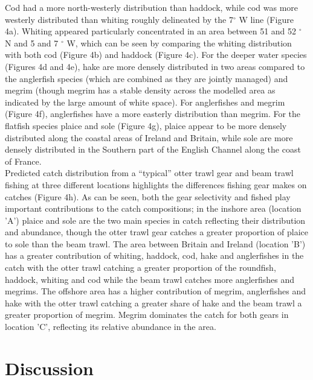 \documentclass[fleqn,10pt]{wlscirep}
\begin{document}
\begin{linenumbers}
Cod had a more north-westerly distribution than haddock, while cod was more
westerly distributed than whiting roughly delineated by the 7$^{\circ}$ W line
(Figure 4a). Whiting appeared particularly concentrated in an area between 51
and 52 $^{\circ}$ N and 5 and 7 $^{\circ}$ W, which can be seen by comparing
the whiting distribution with both cod (Figure 4b) and haddock (Figure 4c). For
the deeper water species (Figures 4d and 4e), hake are more densely distributed
in two areas compared to the anglerfish species (which are combined as they are
jointly managed) and megrim (though megrim has a stable density across the
modelled area as indicated by the large amount of white space). For
anglerfishes and megrim (Figure 4f), anglerfishes have a more easterly
distribution than megrim. For the flatfish species plaice and sole (Figure 4g),
plaice appear to be more densely distributed along the coastal areas of Ireland
and Britain, while sole are more densely distributed in the Southern part of
the English Channel along the coast of France.\\

Predicted catch distribution from a ``typical'' otter trawl gear and beam trawl
fishing at three different locations highlights the differences fishing gear
makes on catches (Figure 4h). As can be seen, both the gear selectivity and
 fished play important contributions to the
catch compositions; in the inshore area (location 'A') plaice and sole are the
two main species in catch reflecting their distribution and abundance, though
the otter trawl gear catches a greater proportion of plaice to sole than the
beam trawl.  The area between Britain and Ireland (location 'B') has a greater
contribution of whiting, haddock, cod, hake and anglerfishes in the catch with
the otter trawl catching a greater proportion of the roundfish, haddock,
whiting and cod while the beam trawl catches more anglerfishes and megrims. The
offshore area has a higher contribution of megrim, anglerfishes and hake with
the otter trawl catching a greater share of hake and the beam trawl a greater
proportion of megrim. Megrim dominates the catch for both gears in location
'C', reflecting its relative abundance in the area.  \\

\section*{Discussion\\}


\end{linenumbers}
\end{document}

